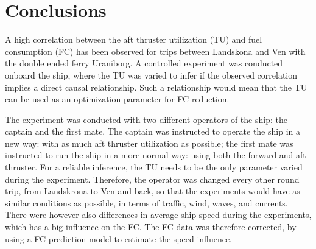 \section{Conclusions}
A high correlation between the aft thruster utilization (TU) and fuel consumption (FC) has been observed for trips between Landskona and Ven with the double ended ferry Uraniborg.  A controlled experiment was conducted onboard the ship, where the TU was varied to infer if the observed correlation implies a direct causal relationship. Such a relationship would mean that the TU can be used as an optimization parameter for FC reduction.

The experiment was conducted with two different operators of the ship: the captain and the first mate. The captain was instructed to operate the ship in a new way: with as much aft thruster utilization as possible; the first mate was instructed to run the ship in a more normal way: using both the forward and aft thruster.
For a reliable inference, the TU needs to be the only parameter varied during the experiment. Therefore, the operator was changed every other round trip, from Landskrona to Ven and back, so that the experiments would have as similar conditions as possible, in terms of traffic, wind, waves, and currents.
There were however also differences in average ship speed during the experiments, which has a big influence on the FC. The FC data was therefore corrected, by using a FC prediction model to estimate the speed influence.

